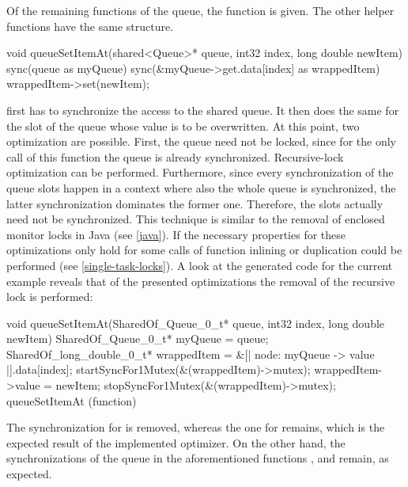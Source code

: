 Of the remaining functions of the queue, the function  is given. The other helper functions have the same structure.
\begin{ccode}
void queueSetItemAt(shared<Queue>* queue, int32 index, long double newItem) { 
  sync(queue as myQueue) { 
    sync(&myQueue->get.data[index] as wrappedItem) { wrappedItem->set(newItem); } 
  } 
}
\end{ccode}
 first has to synchronize the access to the shared queue. It then does the same for the slot of the queue whose value is to be overwritten. At this point, two optimization are possible. First, the queue need not be locked, since for the only call of this function the queue is already synchronized. Recursive-lock optimization can be performed. Furthermore, since every synchronization of the queue slots happen in a context where also the whole queue is synchronized, the latter synchronization dominates the former one. Therefore, the slots actually need not be synchronized. This technique is similar to the removal of enclosed monitor locks in Java (see \ref{java}). If the necessary properties for these optimizations only hold for some calls of  function inlining or duplication could be performed (see \ref{single-task-locks}). A look at the generated code for the current example reveals that of the presented optimizations the removal of the recursive lock is performed:
\begin{ccode}
void queueSetItemAt(SharedOf_Queue_0_t* queue, int32 index, long double newItem) { 
  { 
    SharedOf_Queue_0_t* myQueue = queue; 
    { 
      { 
        SharedOf_long_double_0_t* wrappedItem = &[| node: myQueue -> value |].data[index]; 
        startSyncFor1Mutex(&(wrappedItem)->mutex); 
        { wrappedItem->value = newItem; } 
        stopSyncFor1Mutex(&(wrappedItem)->mutex); 
      } 
    } 
  } 
} queueSetItemAt (function)
\end{ccode}
The synchronization for  is removed, whereas the one for  remains, which is the expected result of the implemented optimizer. On the other hand, the synchronizations of the queue in the aforementioned functions ,  and  remain, as expected.


